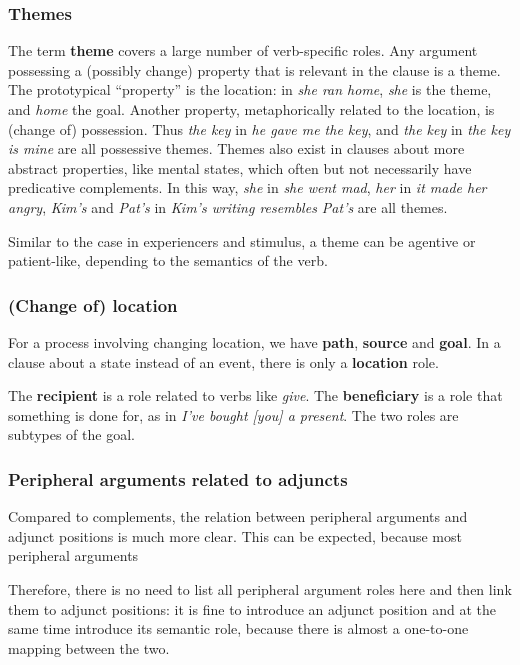 \documentclass{article}
\newcommand*{\concept}[1]{\textbf{#1}}
\newcommand*{\corpus}[1]{\emph{#1}}
\begin{document}
\subsubsection{Themes}

The term \concept{theme} covers a large number of verb-specific roles.
Any argument possessing a (possibly change) property that is relevant in the clause is a theme.
The prototypical ``property'' is the location: 
in \corpus{she ran home}, \corpus{she} is the theme, and \corpus{home} the goal.
Another property, metaphorically related to the location, is (change of) possession.
Thus \corpus{the key} in \corpus{he gave me the key}, and \corpus{the key} in \corpus{the key is mine}
are all possessive themes.
Themes also exist in clauses about more abstract properties, like mental states, 
which often but not necessarily have predicative complements.
In this way, 
\corpus{she} in \corpus{she went mad}, 
\corpus{her} in \corpus{it made her angry},
\corpus{Kim's} and \corpus{Pat's} in \corpus{Kim's writing resembles Pat's}
are all themes.

Similar to the case in experiencers and stimulus,
a theme can be agentive or patient-like, depending to the semantics of the verb.

\subsubsection{(Change of) location}

For a process involving changing location,
we have \concept{path}, \concept{source} and \concept{goal}.
In a clause about a state instead of an event,
there is only a \concept{location} role.

The \concept{recipient} is a role related to verbs like \corpus{give}.
The \concept{beneficiary} is a role that something is done for,
as in \corpus{I've bought [you] a present}.
The two roles are subtypes of the goal.

\subsubsection{Peripheral arguments related to adjuncts}

Compared to complements, the relation between peripheral arguments and adjunct positions 
is much more clear. 
This can be expected, because most peripheral arguments %

Therefore, there is no need to list all peripheral argument roles here 
and then link them to adjunct positions: 
it is fine to introduce an adjunct position and at the same time introduce its semantic role,
because there is almost a one-to-one mapping between the two.
\end{document}
